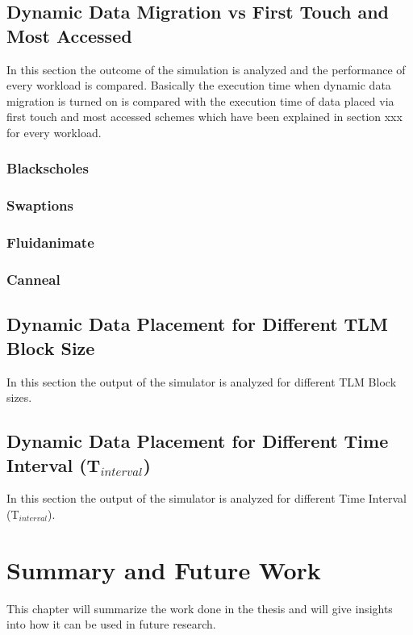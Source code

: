 \documentclass{listhesis}
\begin{document}
\section{Dynamic Data Migration vs First Touch and Most Accessed}
In this section the outcome of the simulation is analyzed and the performance of every workload is compared. Basically the execution time when dynamic data migration is turned on is compared with the execution time of data placed via first touch and most accessed schemes which have been explained in section xxx for every workload.
\subsection{Blackscholes}

\subsection{Swaptions}

\subsection{Fluidanimate}

\subsection{Canneal}


\section{Dynamic Data Placement for Different TLM Block Size}
In this section the output of the simulator is analyzed for different TLM Block sizes. 

\section{Dynamic Data Placement for Different Time Interval (T$_{interval}$)}
In this section the output of the simulator is analyzed for different Time Interval (T$_{interval}$).
\chapter{Summary and Future Work}
This chapter will summarize the work done in the thesis and will give insights into how it can be used in future research. 
\end{document}

